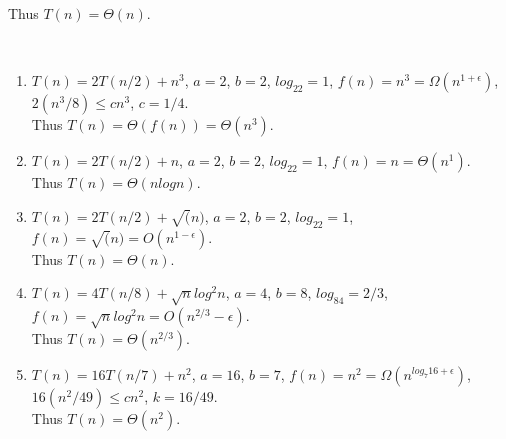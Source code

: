 \documentclass{assignment}
\begin{document}
\begin{problemlist}
\begin{answer}
\begin{enumerate}
Thus $T(n) = \Theta (n)$.\\
\end{enumerate}
\end{answer}

\clearpage
\pbitem
\begin{problem}
\end{problem}
\begin{answer}
\\
\begin{enumerate}
\item
$T(n)=2T(n/2)+n^3$, $a=2$, $b=2$, $log_22=1$, $f(n)=n^3=\Omega (n^{1+\epsilon})$, $2(n^3/8)\le cn^3$, $c=1/4$.\\
Thus $T(n) = \Theta(f(n)) = \Theta(n^3)$.\\ 
\item
$T(n)=2T(n/2)+n$, $a=2$, $b=2$, $log_22=1$, $f(n)=n=\Theta (n^1)$.\\
Thus $T(n) = \Theta(nlogn)$.\\
\item
$T(n)=2T(n/2)+\sqrt(n)$, $a=2$, $b=2$, $log_22=1$, $f(n)=\sqrt(n)=O(n^{1-\epsilon})$.\\
Thus $T(n)=\Theta(n)$.\\
\item
$T(n)=4T(n/8)+\sqrt{n}log^2n$, $a=4$, $b=8$, $log_84=2/3$, $f(n)=\sqrt{n}log^2n=O(n^{2/3}-\epsilon)$.\\
Thus $T(n)=\Theta (n^{2/3})$.\\
\item
$T(n)=16T(n/7)+n^2$, $a=16$, $b=7$, $f(n)=n^2=\Omega (n^{log_7 16 + \epsilon})$, $16(n^2/49)\le cn^2$, $k=16/49$.\\
Thus $T(n)=\Theta (n^2)$.\\
\end{enumerate}
\end{answer}


\end{problemlist}
\end{document}
